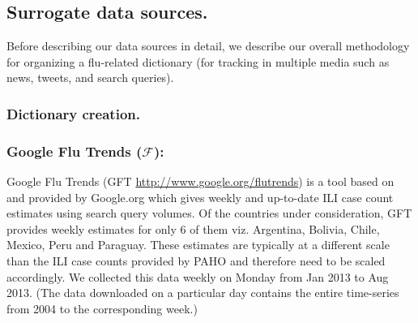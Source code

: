 
\vspace{-1em}
\subsection{Surrogate data sources.} Before
describing our data sources in detail, we describe our overall methodology
for organizing a flu-related dictionary (for tracking in multiple media such
as news, tweets, and search queries).
\vspace{-1em}
\subsubsection{\label{sec:keyword} Dictionary creation.} 
\vspace{-1em}

\subsubsection{Google Flu Trends ($\mathcal{F}$):}
Google Flu Trends (GFT \url{http://www.google.org/flutrends}) is a tool based
on~\cite{ginsberg2008detecting} and provided by Google.org which gives weekly
and up-to-date ILI case count estimates using search query volumes. 
Of the countries under
consideration, GFT provides weekly estimates for only 6 of them viz.  Argentina,
Bolivia, Chile, Mexico, Peru and Paraguay. 
These estimates are typically at
a different scale than the ILI case counts provided by PAHO and therefore need
to be scaled accordingly.  We collected this data weekly on Monday from Jan
2013 to Aug 2013. (The data downloaded on a particular day contains the entire
time-series from 2004 to the corresponding week.)
 
